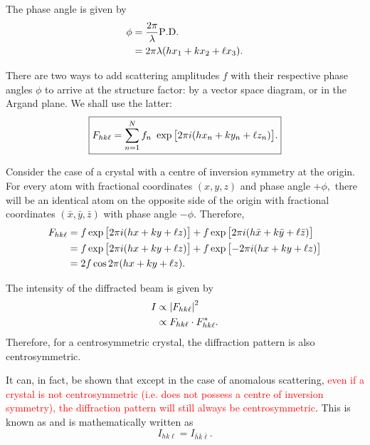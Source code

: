 	The phase angle is given by%
%	
	\begin{align}
	\phi &= \dfrac{2\pi}{\lambda} \mathrm{P.D.} \nonumber \\
		 &= 2 \pi \lambda \qty( h x_1 + k x_2 + \ell x_3 ).
	\end{align}
	
	There are two ways to add scattering amplitudes $f$ with their respective phase angles $\phi$ to arrive at the structure factor: by a vector space diagram, or in the Argand plane. We shall use the latter:%
%	
	\begin{equation}
	\boxed{F_{hk\ell} = \sum_{n = 1}^N f_n ~ \exp \qty[ 2\pi i \qty( h x_n + k y_n + \ell z_n ) ].}
	\end{equation}
	
	Consider the case of a crystal with a centre of inversion symmetry at the origin. For every atom with fractional coordinates $(x,y,z)$ and phase angle $+\phi,$ there will be an identical atom on the opposite side of the origin with fractional coordinates $(\bar{x}, \bar{y}, \bar{z})$ with phase angle $-\phi.$ Therefore,%
%	
	\begin{align}
	F_{hk\ell} &= f \exp \qty[ 2\pi i \qty( h x + k y + \ell z ) ] + f \exp \qty[ 2\pi i \qty( h \bar{x} + k \bar{y} + \ell \bar{z} ) ] \nonumber \\
		&= f \exp \qty[ 2\pi i \qty( h x + k y + \ell z ) ] + f \exp \qty[ - 2\pi i \qty( h x + k y + \ell z ) ] \nonumber \\
		&= 2f \cos 2\pi \qty( h x + k y + \ell z ).
	\end{align}%
	
	The intensity of the diffracted beam is given by%
%	
	\begin{align}
	I &\propto \abs{F_{hk\ell}} ^2 \nonumber \\
	  & \propto F_{hk\ell} \cdot F^*_{hk\ell}.
	\end{align}%
%	
	Therefore, for a centrosymmetric crystal, the diffraction pattern is also centrosymmetric.
	
	It can, in fact, be shown that except in the case of anomalous scattering, \textcolor{red}{even if a crystal is not centrosymmetric (i.e. does not possess a centre of inversion symmetry), the diffraction pattern will still always be centrosymmetric}. This is known as  and is mathematically written as%
%	
	\begin{equation}
	\boxed{I_{hk\ell} = I_{\bar{h} \bar{k} \bar{\ell}}.} \label{eq:friedel_law}
	\end{equation}
	
